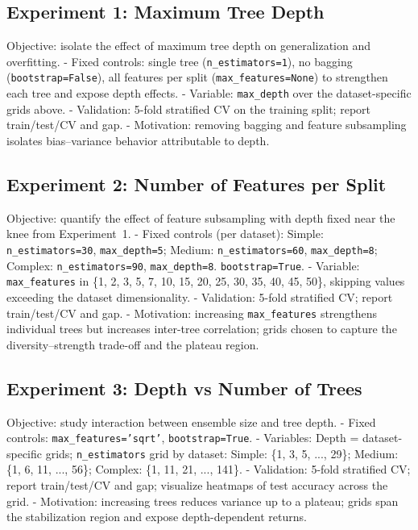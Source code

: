 \documentclass[conference]{IEEEtran}
\begin{document}
\subsection{Experiment 1: Maximum Tree Depth}
Objective: isolate the effect of maximum tree depth on generalization and overfitting.
- Fixed controls: single tree (\texttt{n\_estimators=1}), no bagging (\texttt{bootstrap=False}), all features per split (\texttt{max\_features=None}) to strengthen each tree and expose depth effects.
- Variable: \texttt{max\_depth} over the dataset-specific grids above.
- Validation: 5-fold stratified CV on the training split; report train/test/CV and gap.
- Motivation: removing bagging and feature subsampling isolates bias–variance behavior attributable to depth.

\subsection{Experiment 2: Number of Features per Split}
Objective: quantify the effect of feature subsampling with depth fixed near the knee from Experiment~1.
- Fixed controls (per dataset): Simple: \texttt{n\_estimators=30}, \texttt{max\_depth=5}; Medium: \texttt{n\_estimators=60}, \texttt{max\_depth=8}; Complex: \texttt{n\_estimators=90}, \texttt{max\_depth=8}. \texttt{bootstrap=True}.
- Variable: \texttt{max\_features} in \{1, 2, 3, 5, 7, 10, 15, 20, 25, 30, 35, 40, 45, 50\}, skipping values exceeding the dataset dimensionality.
- Validation: 5-fold stratified CV; report train/test/CV and gap.
- Motivation: increasing \texttt{max\_features} strengthens individual trees but increases inter-tree correlation; grids chosen to capture the diversity–strength trade-off and the plateau region.

\subsection{Experiment 3: Depth vs Number of Trees}
Objective: study interaction between ensemble size and tree depth.
- Fixed controls: \texttt{max\_features='sqrt'}, \texttt{bootstrap=True}.
- Variables: 
  Depth = dataset-specific grids; 
  \texttt{n\_estimators} grid by dataset: Simple: \{1, 3, 5, ..., 29\}; Medium: \{1, 6, 11, ..., 56\}; Complex: \{1, 11, 21, ..., 141\}.
- Validation: 5-fold stratified CV; report train/test/CV and gap; visualize heatmaps of test accuracy across the grid.
- Motivation: increasing trees reduces variance up to a plateau; grids span the stabilization region and expose depth-dependent returns. 
\end{document}
